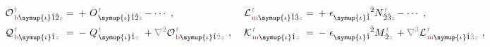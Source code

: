\begin{subequations} \label{eq:multipole}
	\abovedisplayskip=7pt
	\belowdisplayskip=8pt
\begin{align}
	&{\mathcal{O}}^{\;\!\mathcolor{gray}{t}}_{\;\!\textcolor{Maroon}{\text{b}} \symup{\iota}\hat{1}\hat{2} \mathcolor{gray}{z}} \hspace{-1em}&&=\hspace{0.2em} +~ O^{\;\!\mathcolor{gray}{t}}_{\;\! \symup{\iota}\hat{1}\hat{2}\mathcolor{gray}{z}} &&\hspace{-1.1em}- \cdots~, &&\hspace{0.3em} {\mathcal{L}}^{\;\!\mathcolor{gray}{t}}_{\;\!\textcolor{Maroon}{\text{m}} \symup{\iota}\hat{1}\hat{3} \mathcolor{gray}{z}} \hspace{-1em}&&=\hspace{0.2em} +~ \epsilon^{\hphantom{\symup{\iota}\hat{1}}\hat{2}}_{\symup{\iota} \hat{1}} N^{\;\!\mathcolor{gray}{t}}_{\;\! \hat{2}\hat{3} \mathcolor{gray}{z}} &&\hspace{-1.1em}- \cdots~, \label{eq:Ob-Lm} \\
	&{\mathcal{Q}}^{\;\!\mathcolor{gray}{t}}_{\;\!\textcolor{Maroon}{\text{b}} \symup{\iota}\hat{1} \mathcolor{gray}{z}} \hspace{-1em}&&=\hspace{0.2em} -~ Q^{\;\!\mathcolor{gray}{t}}_{\;\! \symup{\iota}\hat{1}\mathcolor{gray}{z}} &&\hspace{-1.1em}+ \mathcolor{gray}{\nabla^{\hat{2}}} {\mathcal{O}}^{\;\!\mathcolor{gray}{t}}_{\;\!\textcolor{Maroon}{\text{b}} \symup{\iota} \hat{1} \mathcolor{gray}{\hat{2}} \mathcolor{gray}{z}}~,  &&\hspace{0.3em} {\mathcal{K}}^{\;\!\mathcolor{gray}{t}}_{\;\!\textcolor{Maroon}{\text{m}} \symup{\iota}\hat{1} \mathcolor{gray}{z}} \hspace{-1em}&&=\hspace{0.2em} -~ \epsilon^{\hphantom{\symup{\iota}\hat{1}}\hat{2}}_{\symup{\iota} \hat{1}} M^{\;\!\mathcolor{gray}{t}}_{\;\! \hat{2}\mathcolor{gray}{z}} &&\hspace{-1.1em}+ \mathcolor{gray}{\nabla^{\hat{3}}} {\mathcal{L}}^{\;\!\mathcolor{gray}{t}}_{\;\!\textcolor{Maroon}{\text{m}} \symup{\iota} \hat{1} \mathcolor{gray}{\hat{3}} \mathcolor{gray}{z}}~, \label{eq:Qb-Km} \\

\end{align}
\end{subequations}
